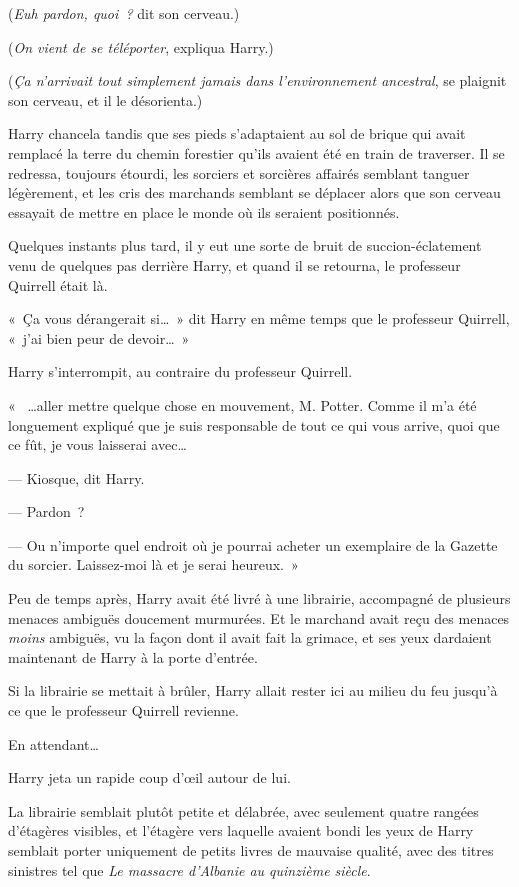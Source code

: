 (\emph{Euh pardon, quoi~?} dit son cerveau.)

(\emph{On vient de se téléporter}, expliqua Harry.)

(\emph{Ça n'arrivait tout simplement jamais dans l'environnement ancestral}, se plaignit son cerveau, et il le désorienta.)

Harry chancela tandis que ses pieds s'adaptaient au sol de brique qui avait remplacé la terre du chemin forestier qu'ils avaient été en train de traverser. Il se redressa, toujours étourdi, les sorciers et sorcières affairés semblant tanguer légèrement, et les cris des marchands semblant se déplacer alors que son cerveau essayait de mettre en place le monde où ils seraient positionnés.

Quelques instants plus tard, il y eut une sorte de bruit de succion-éclatement venu de quelques pas derrière Harry, et quand il se retourna, le professeur Quirrell était là.

«~Ça vous dérangerait si…~» dit Harry en même temps que le professeur Quirrell, «~j'ai bien peur de devoir…~»

Harry s'interrompit, au contraire du professeur Quirrell.

«~ …aller mettre quelque chose en mouvement, M. Potter. Comme il m'a été longuement expliqué que je suis responsable de tout ce qui vous arrive, quoi que ce fût, je vous laisserai avec…

--- Kiosque, dit Harry.

--- Pardon~?

--- Ou n'importe quel endroit où je pourrai acheter un exemplaire de la Gazette du sorcier. Laissez-moi là et je serai heureux.~»

Peu de temps après, Harry avait été livré à une librairie, accompagné de plusieurs menaces ambiguës doucement murmurées. Et le marchand avait reçu des menaces \emph{moins} ambiguës, vu la façon dont il avait fait la grimace, et ses yeux dardaient maintenant de Harry à la porte d'entrée.

Si la librairie se mettait à brûler, Harry allait rester ici au milieu du feu jusqu'à ce que le professeur Quirrell revienne.

En attendant…

Harry jeta un rapide coup d'œil autour de lui.

La librairie semblait plutôt petite et délabrée, avec seulement quatre rangées d'étagères visibles, et l'étagère vers laquelle avaient bondi les yeux de Harry semblait porter uniquement de petits livres de mauvaise qualité, avec des titres sinistres tel que \emph{Le massacre d'Albanie au quinzième siècle}.

